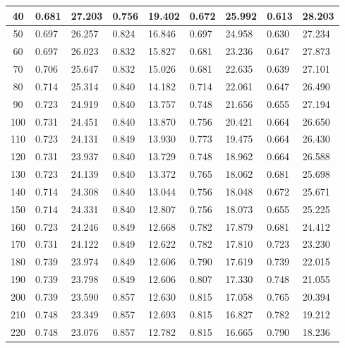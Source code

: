 \documentclass{report}
\begin{document}
\begin{minipage}{\textwidth}
\begin{longtable}{|c|l|l|l|l|l|l|l|l|}
                     40 & 0.681 & 27.203 & 0.756 & 19.402 & 0.672 & 25.992 & 0.613 & 28.203 \\ \hline
                     50 & 0.697 & 26.257 & 0.824 & 16.846 & 0.697 & 24.958 & 0.630 & 27.234 \\ \hline
                     60 & 0.697 & 26.023 & 0.832 & 15.827 & 0.681 & 23.236 & 0.647 & 27.873 \\ \hline
                     70 & 0.706 & 25.647 & 0.832 & 15.026 & 0.681 & 22.635 & 0.639 & 27.101 \\ \hline
                     80 & 0.714 & 25.314 & 0.840 & 14.182 & 0.714 & 22.061 & 0.647 & 26.490 \\ \hline
                     90 & 0.723 & 24.919 & 0.840 & 13.757 & 0.748 & 21.656 & 0.655 & 27.194 \\ \hline
                     100 & 0.731 & 24.451 & 0.840 & 13.870 & 0.756 & 20.421 & 0.664 & 26.650 \\ \hline
                     110 & 0.723 & 24.131 & 0.849 & 13.930 & 0.773 & 19.475 & 0.664 & 26.430 \\ \hline
                     120 & 0.731 & 23.937 & 0.840 & 13.729 & 0.748 & 18.962 & 0.664 & 26.588 \\ \hline
                     130 & 0.723 & 24.139 & 0.840 & 13.372 & 0.765 & 18.062 & 0.681 & 25.698 \\ \hline
                     140 & 0.714 & 24.308 & 0.840 & 13.044 & 0.756 & 18.048 & 0.672 & 25.671 \\ \hline
                     150 & 0.714 & 24.331 & 0.840 & 12.807 & 0.756 & 18.073 & 0.655 & 25.225 \\ \hline
                     160 & 0.723 & 24.246 & 0.849 & 12.668 & 0.782 & 17.879 & 0.681 & 24.412 \\ \hline
                     170 & 0.731 & 24.122 & 0.849 & 12.622 & 0.782 & 17.810 & 0.723 & 23.230 \\ \hline
                     180 & 0.739 & 23.974 & 0.849 & 12.606 & 0.790 & 17.619 & 0.739 & 22.015 \\ \hline
                     190 & 0.739 & 23.798 & 0.849 & 12.606 & 0.807 & 17.330 & 0.748 & 21.055 \\ \hline
                     200 & 0.739 & 23.590 & 0.857 & 12.630 & 0.815 & 17.058 & 0.765 & 20.394 \\ \hline
                     210 & 0.748 & 23.349 & 0.857 & 12.693 & 0.815 & 16.827 & 0.782 & 19.212 \\ \hline
                     220 & 0.748 & 23.076 & 0.857 & 12.782 & 0.815 & 16.665 & 0.790 & 18.236 \\ \hline

\end{longtable}
\end{minipage}
\end{document}
